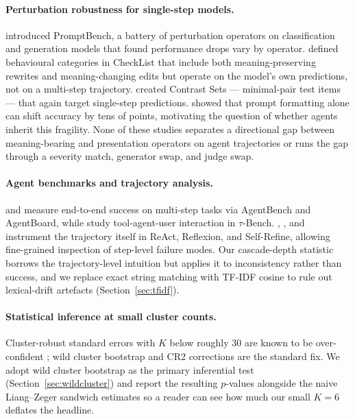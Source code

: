 \documentclass[11pt]{article}
\begin{document}
\paragraph{Perturbation robustness for single-step models.}
\citet{Zhu2024PromptBench} introduced PromptBench, a battery of perturbation operators on classification and generation models that found performance drops vary by operator. \citet{Ribeiro2020CheckList} defined behavioural categories in CheckList that include both meaning-preserving rewrites and meaning-changing edits but operate on the model's own predictions, not on a multi-step trajectory. \citet{Gardner2020ContrastSets} created Contrast Sets --- minimal-pair test items --- that again target single-step predictions. \citet{Sclar2024Formatting} showed that prompt formatting alone can shift accuracy by tens of points, motivating the question of whether agents inherit this fragility. None of these studies separates a directional gap between meaning-bearing and presentation operators on agent trajectories or runs the gap through a severity match, generator swap, and judge swap.

\paragraph{Agent benchmarks and trajectory analysis.}
\citet{Liu2024AgentBench} and \citet{Yan2024AgentBoard} measure end-to-end success on multi-step tasks via AgentBench and AgentBoard, while \citet{Yao2025TauBench} study tool-agent-user interaction in $\tau$-Bench. \citet{Yao2023ReAct}, \citet{Shinn2023Reflexion}, and \citet{Madaan2023SelfRefine} instrument the trajectory itself in ReAct, Reflexion, and Self-Refine, allowing fine-grained inspection of step-level failure modes. Our cascade-depth statistic borrows the trajectory-level intuition but applies it to inconsistency rather than success, and we replace exact string matching with TF-IDF cosine to rule out lexical-drift artefacts (Section~\ref{sec:tfidf}).

\paragraph{Statistical inference at small cluster counts.}
Cluster-robust standard errors with $K$ below roughly 30 are known to be over-confident \citep{Liang1986GEE}; wild cluster bootstrap \citep{Cameron2008WildBoot, Roodman2019Boottest} and CR2 corrections are the standard fix. We adopt wild cluster bootstrap as the primary inferential test (Section~\ref{sec:wildcluster}) and report the resulting $p$-values alongside the naive Liang--Zeger sandwich estimates so a reader can see how much our small $K=6$ deflates the headline.
\end{document}
